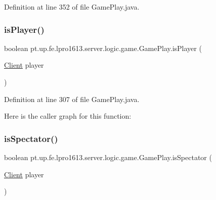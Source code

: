 Definition at line 352 of file Game\+Play.\+java.

\hypertarget{classpt_1_1up_1_1fe_1_1lpro1613_1_1server_1_1logic_1_1game_1_1_game_play_a64af21d57da05af1d37d17ea71109aa7}{}\label{classpt_1_1up_1_1fe_1_1lpro1613_1_1server_1_1logic_1_1game_1_1_game_play_a64af21d57da05af1d37d17ea71109aa7} 
\subsubsection{\texorpdfstring{is\+Player()}{isPlayer()}}
{\footnotesize\ttfamily boolean pt.\+up.\+fe.\+lpro1613.\+server.\+logic.\+game.\+Game\+Play.\+is\+Player (\begin{DoxyParamCaption}\item[{\hyperlink{classpt_1_1up_1_1fe_1_1lpro1613_1_1server_1_1conn_1_1_client}{Client}}]{player }\end{DoxyParamCaption})}



Definition at line 307 of file Game\+Play.\+java.

Here is the caller graph for this function\+:
\hypertarget{classpt_1_1up_1_1fe_1_1lpro1613_1_1server_1_1logic_1_1game_1_1_game_play_ac5e55275f14fd2a9cf8f430a14cf9b6e}{}\label{classpt_1_1up_1_1fe_1_1lpro1613_1_1server_1_1logic_1_1game_1_1_game_play_ac5e55275f14fd2a9cf8f430a14cf9b6e} 
\subsubsection{\texorpdfstring{is\+Spectator()}{isSpectator()}}
{\footnotesize\ttfamily boolean pt.\+up.\+fe.\+lpro1613.\+server.\+logic.\+game.\+Game\+Play.\+is\+Spectator (\begin{DoxyParamCaption}\item[{\hyperlink{classpt_1_1up_1_1fe_1_1lpro1613_1_1server_1_1conn_1_1_client}{Client}}]{player }\end{DoxyParamCaption})}



